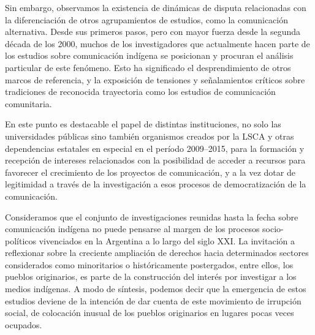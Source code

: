 \documentclass{tufte-handout}
\begin{document}
Sin embargo, observamos la existencia de dinámicas de disputa
relacionadas con la diferenciación de otros agrupamientos de estudios,
como la comunicación alternativa. Desde sus primeros pasos, pero con
mayor fuerza desde la segunda década de los 2000, muchos de los
investigadores que actualmente hacen parte de los estudios sobre
comunicación indígena se posicionan y procuran el análisis particular de
este fenómeno. Esto ha significado el desprendimiento de otros marcos de
referencia, y la exposición de tensiones y señalamientos críticos sobre
tradiciones de reconocida trayectoria como los estudios de comunicación
comunitaria.

En este punto es destacable el papel de distintas instituciones, no solo
las universidades públicas sino también organismos creados por la LSCA y
otras dependencias estatales en especial en el período 2009--2015, para
la formación y recepción de intereses relacionados con la posibilidad de
acceder a recursos para favorecer el crecimiento de los proyectos de
comunicación, y a la vez dotar de legitimidad a través de la
investigación a esos procesos de democratización de la comunicación.

Consideramos que el conjunto de investigaciones reunidas hasta la fecha
sobre comunicación indígena no puede pensarse al margen de los procesos
socio-políticos vivenciados en la Argentina a lo largo del siglo XXI. La
invitación a reflexionar sobre la creciente ampliación de derechos hacia
determinados sectores considerados como minoritarios o históricamente
postergados, entre ellos, los pueblos originarios, es parte de la
construcción del interés por investigar a los medios indígenas. A modo
de síntesis, podemos decir que la emergencia de estos estudios deviene
de la intención de dar cuenta de este movimiento de irrupción social, de
colocación inusual de los pueblos originarios en lugares pocas veces
ocupados.
\end{document}
